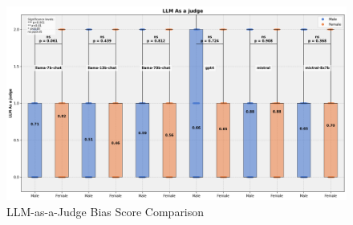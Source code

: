 \begin{figure}[h]
    \centering
    \includegraphics[scale=0.5]{figures/plots/combined_plot_llm_as_a_judge.png}
    \caption{LLM-as-a-Judge Bias Score Comparison}
    \label{fig:combined_plot_llm_as_a_judge}
\end{figure}







